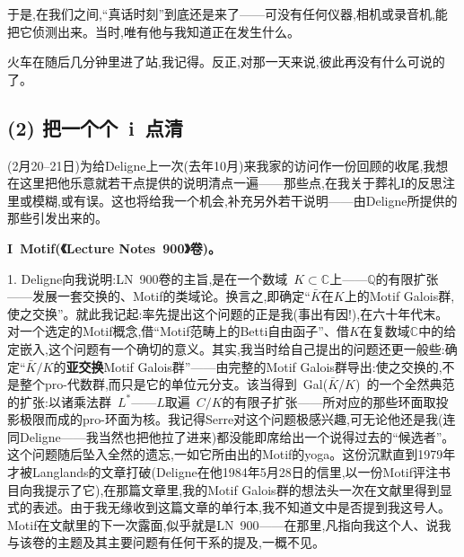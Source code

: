 于是,在我们之间,“真话时刻”到底还是来了——可没有任何仪器,相机或录音机,能把它侦测出来。当时,唯有他与我知道正在发生什么。

火车在随后几分钟里进了站,我记得。反正,对那一天来说,彼此再没有什么可说的了。

\subsection{(2) 把一个个~i~点清}


(2月20–21日)为给Deligne上一次(去年10月)来我家的访问作一份回顾的收尾,我想在这里把他乐意就若干点提供的说明清点一遍——那些点,在我关于葬礼I的反思注里或模糊,或有误。这也将给我一个机会,补充另外若干说明——由Deligne所提供的那些引发出来的\dmark{}。

\textbf{I~Motif(《Lecture Notes~900》卷)。}

1. Deligne向我说明:LN~900卷的主旨,是在一个数域~$K\subset\mathbb{C}$上——$\mathbb{Q}$的有限扩张——发展一套交换的、Motif的类域论。换言之,即确定“$\bar{K}$在$K$上的Motif Galois群,使之交换”。就此我记起:率先提出这个问题的正是我(事出有因!),在六十年代末。对一个选定的Motif概念,借“Motif范畴上的Betti自由函子”、借$K$在复数域$\mathbb{C}$中的给定嵌入,这个问题有一个确切的意义。其实,我当时给自己提出的问题还更一般些:确定“$\bar{K}/K$的\textbf{亚交换}Motif Galois群”——由完整的Motif Galois群导出:使之交换的,不是整个pro-代数群,而只是它的单位元分支。该当得到~Gal($\bar{K}$/$K$)~的一个全然典范的扩张:以诸乘法群~$L^*$——$L$取遍~$C/K$的有限子扩张——所对应的那些环面取投影极限而成的pro-环面为核。我记得Serre对这个问题极感兴趣,可无论他还是我(连同Deligne——我当然也把他拉了进来)都没能即席给出一个说得过去的“候选者”。这个问题随后坠入全然的遗忘,一如它所由出的Motif的yoga。这份沉默直到1979年才被Langlands的文章打破(Deligne在他1984年5月28日的信里,以一份Motif评注书目向我提示了它),在那篇文章里,我的Motif Galois群的想法头一次在文献里得到显式的表述。由于我无缘收到这篇文章的单行本,我不知道文中是否提到我这号人。Motif在文献里的下一次露面,似乎就是LN~900——在那里,凡指向我这个人、说我与该卷的主题及其主要问题有任何干系的提及,一概不见。

